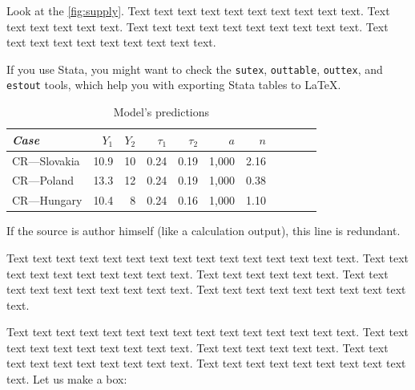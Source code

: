 Look at the \autoref{fig:supply}. Text text text text text text text text text text. Text text text text text text. Text text text text text text text text text text. Text text text text text text text text text text.





If you use Stata, you might want to check the \texttt{sutex}, \texttt{outtable}, \texttt{outtex}, and \texttt{estout} tools, which help you with exporting Stata tables to \LaTeX{}.


\begin{table}[!htbp]
\begin{center}
	\caption[Calibration table]{Model's predictions}\label{tab:values}
\begin{tabular}{lrrrrrrrrrr}
\toprule
\textit{Case} &        $Y_1$ &        $Y_2$ &  $\tau_1$ &  $\tau_2$ &          $a$ &          $n$\\
\midrule
CR---Slovakia &       10.9 &         10 &       0.24 &       0.19 &          1,000 &       2.16\\

CR---Poland &       13.3 &         12 &       0.24 &       0.19 &          1,000 &       0.38\\

CR---Hungary &       10.4 &          8 &       0.24 &       0.16 &          1,000 &        1.10\\
\bottomrule
\end{tabular}  
\end{center}
\begin{source} If the source is author himself (like a calculation output), this line is redundant.\end{source}
\end{table}

Text text text text text text text text text text text text text text text. Text text text text text text text text text text. Text text text text text text. Text text text text text text text text text text. Text text text text text text text text text text.



Text text text text text text text text text text text text text text text. Text text text text text text text text text text. Text text text text text text. Text text text text text text text text text text. Text text text text text text text text text text. Let us make a box:

